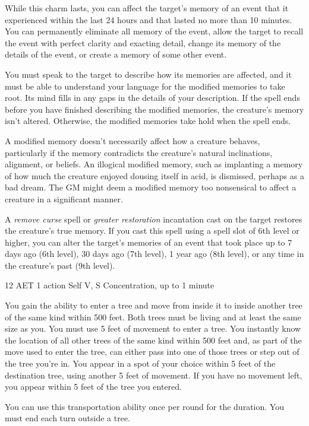 While this charm lasts, you can affect the target's memory of an event that it experienced within the last 24 hours and that lasted no more than 10 minutes. You can permanently eliminate all memory of the event, allow the target to recall the event with perfect clarity and exacting detail, change its memory of the details of the event, or create a memory of some other event.

You must speak to the target to describe how its memories are affected, and it must be able to understand your language for the modified memories to take root. Its mind fills in any gaps in the details of your description. If the spell ends before you have finished describing the modified memories, the creature's memory isn't altered. Otherwise, the modified memories take hold when the spell ends.

A modified memory doesn't necessarily affect how a creature behaves, particularly if the memory contradicts the creature's natural inclinations, alignment, or beliefs. An illogical modified memory, such as implanting a memory of how much the creature enjoyed dousing itself in acid, is dismissed, perhaps as a bad dream. The GM might deem a modified memory too nonsensical to affect a creature in a significant manner.

A \textit{remove curse} spell or \textit{greater restoration} incantation cast on the target restores the creature's true memory.
{If you cast this spell using a spell slot of 6th level or higher, you can alter the target's memories of an event that took place up to 7 days ago (6th level), 30 days ago (7th level), 1 year ago (8th level), or any time in the creature's past (9th level).}

\label{spell:tree-stride}
{12 AET}
{1 action}
{Self}
{V, S}
{Concentration, up to 1 minute}

You gain the ability to enter a tree and move from inside it to inside another tree of the same kind within 500 feet. Both trees must be living and at least the same size as you. You must use 5 feet of movement to enter a tree. You instantly know the location of all other trees of the same kind within 500 feet and, as part of the move used to enter the tree, can either pass into one of those trees or step out of the tree you're in. You appear in a spot of your choice within 5 feet of the destination tree, using another 5 feet of movement. If you have no movement left, you appear within 5 feet of the tree you entered.

You can use this transportation ability once per round for the duration. You must end each turn outside a tree.

